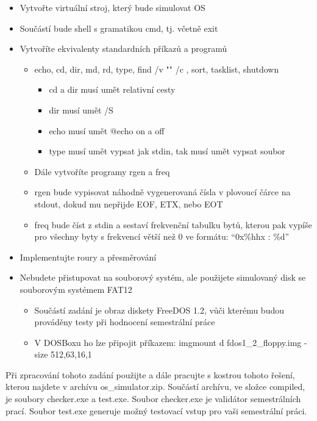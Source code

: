 \documentclass[ 12pt, a4paper]{article}
\begin{document}
\begin{itemize}
	\item Vytvořte virtuální stroj, který bude simulovat OS
	\item Součástí bude shell s gramatikou cmd, tj. včetně exit
	\item Vytvoříte ekvivalenty standardních příkazů a programů
	
	\begin{itemize}
		\item echo, cd, dir, md, rd, type, find /v "" /c , sort, tasklist, shutdown
		\begin{itemize}
			\item cd a dir musí umět relativní cesty
			\item dir musí umět /S
			\item echo musí umět @echo on a off
			\item type musí umět vypsat jak stdin, tak musí umět vypsat soubor
		\end{itemize}
		\item Dále vytvoříte programy rgen a freq
		\item rgen bude vypisovat náhodně vygenerovaná čísla v plovoucí čárce na stdout, dokud mu nepřijde EOF, ETX, nebo EOT
		\item freq bude číst z stdin a sestaví frekvenční tabulku bytů, kterou pak vypíše pro všechny byty s frekvencí větší než 0 ve formátu: “0x\%hhx : \%d”
	\end{itemize}
	\item Implementujte roury a přesměrování
	\item Nebudete přistupovat na souborový systém, ale použijete simulovaný disk se souborovým systémem FAT12
	\begin{itemize}
		\item Součástí zadání je obraz diskety FreeDOS 1.2, vůči kterému budou prováděny testy při hodnocení semestrální práce
		\item V DOSBoxu ho lze připojit příkazem: imgmount d fdos1\_2\_floppy.img -size 512,63,16,1
	\end{itemize}
\end{itemize}


Při zpracování tohoto zadání použijte a dále pracujte s kostrou tohoto řešení, kterou najdete v archívu os\_simulator.zip. Součástí archívu, ve složce compiled, je soubory checker.exe a test.exe. Soubor checker.exe je validátor semestrálních prací. Soubor test.exe generuje možný testovací vstup pro vaši semestrální práci.
\end{document}
